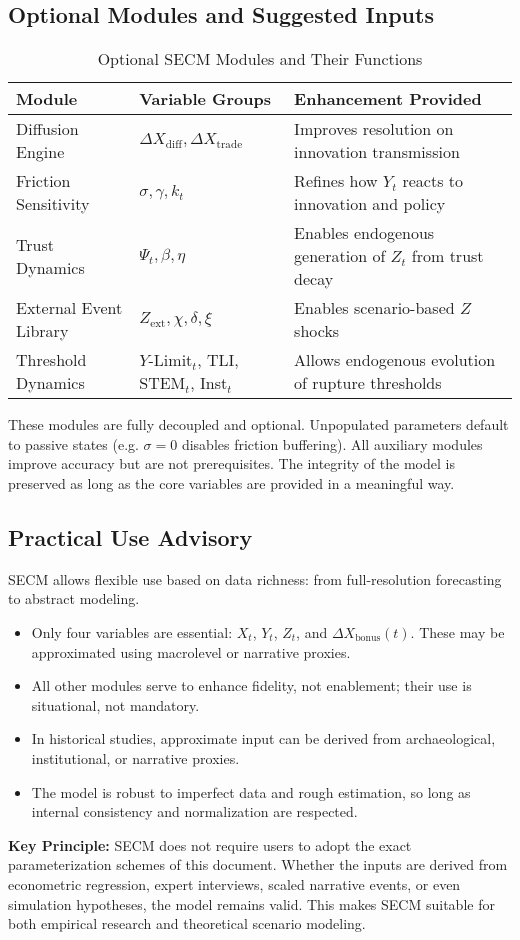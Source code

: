 \documentclass[12pt]{report}
\begin{document}
\subsection{Optional Modules and Suggested Inputs}
\begin{table}[h!]
\centering
\caption{Optional SECM Modules and Their Functions}
\begin{tabular}{|l|l|p{7cm}|}
\hline
\textbf{Module} & \textbf{Variable Groups} & \textbf{Enhancement Provided} \\
\hline
Diffusion Engine & $\Delta X_{\text{diff}}, \Delta X_{\text{trade}}$ & Improves resolution on innovation transmission \\
Friction Sensitivity & $\sigma, \gamma, k_t$ & Refines how $Y_t$ reacts to innovation and policy \\
Trust Dynamics & $\Psi_t, \beta, \eta$ & Enables endogenous generation of $Z_t$ from trust decay \\
External Event Library & $Z_{\text{ext}}, \chi, \delta, \xi$ & Enables scenario-based $Z$ shocks \\
Threshold Dynamics & $Y$-Limit$_t$, TLI, STEM$_t$, Inst$_t$ & Allows endogenous evolution of rupture thresholds \\
\hline
\end{tabular}
\end{table}

These modules are fully decoupled and optional. Unpopulated parameters default to passive states (e.g. $\sigma = 0$ disables friction buffering). All auxiliary modules improve accuracy but are not prerequisites. The integrity of the model is preserved as long as the core variables are provided in a meaningful way.

\subsection{Practical Use Advisory}
SECM allows flexible use based on data richness: from full-resolution forecasting to abstract modeling.
\begin{itemize}
  \item Only four variables are essential: $X_t$, $Y_t$, $Z_t$, and $\Delta X_{\text{bonus}}(t)$. These may be approximated using macrolevel or narrative proxies.
  \item All other modules serve to enhance fidelity, not enablement; their use is situational, not mandatory.
  \item In historical studies, approximate input can be derived from archaeological, institutional, or narrative proxies.
  \item The model is robust to imperfect data and rough estimation, so long as internal consistency and normalization are respected.
\end{itemize}
\textbf{Key Principle:} SECM does not require users to adopt the exact parameterization schemes of this document. Whether the inputs are derived from econometric regression, expert interviews, scaled narrative events, or even simulation hypotheses, the model remains valid. This makes SECM suitable for both empirical research and theoretical scenario modeling.
\end{document}
